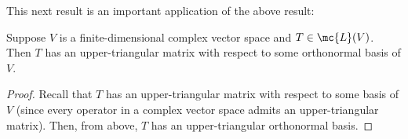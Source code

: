 \documentclass[math0540-lecture-notes.tex]{subfiles}
\begin{document}
This next result is an important application of the above result:
\begin{theorem}{}
  Suppose $V$ is a finite-dimensional complex vector space and $T\in \mc{L}(V)$. Then $T$ has an
  upper-triangular matrix with respect to some orthonormal basis of $V$.
\end{theorem}
\begin{proof}[Proof]
  Recall that $T$ has an upper-triangular matrix with respect to some basis of $V$ (since every
  operator in a complex vector space admits an upper-triangular matrix). Then, from above, $T$ has
  an upper-triangular orthonormal basis.
\end{proof}
\end{document}
